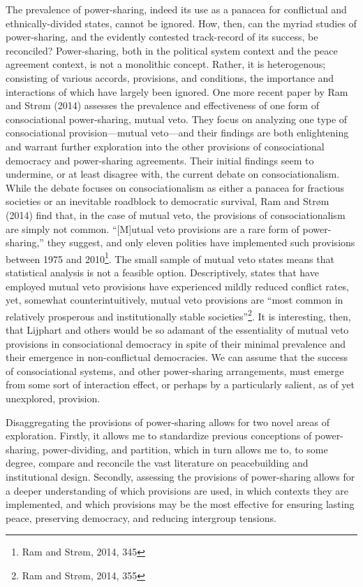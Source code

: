 \documentclass[12pt]{article}
\begin{document}
The prevalence of power-sharing, indeed its use as a panacea for conflictual and ethnically-divided states, cannot be ignored. How, then, can the myriad studies of power-sharing, and the evidently contested track-record of its success, be reconciled? Power-sharing, both in the political system context and the peace agreement context, is not a monolithic concept. Rather, it is heterogenous; consisting of various accords, provisions, and conditions, the importance and interactions of which have largely been ignored. One more recent paper by Ram and Strøm (2014) assesses the prevalence and effectiveness of one form of consociational power-sharing, mutual veto. They focus on analyzing one type of consociational provision---mutual veto---and their findings are both enlightening and warrant further exploration into the other provisions of consociational democracy and power-sharing agreements. Their initial findings seem to undermine, or at least disagree with, the current debate on consociationalism. While the debate focuses on consociationalism as either a panacea for fractious societies or an inevitable roadblock to democratic survival, Ram and Strøm (2014) find that, in the case of mutual veto, the provisions of consociationalism are simply not common. “[M]utual veto provisions are a rare form of power-sharing,” they suggest, and only eleven polities have implemented such provisions between 1975 and 2010\footnote{Ram and Strøm, 2014, 345}. The small sample of mutual veto states means that statistical analysis is not a feasible option. Descriptively, states that have employed mutual veto provisions have experienced mildly reduced conflict rates, yet, somewhat counterintuitively, mutual veto provisions are “most common in relatively prosperous and institutionally stable societies”\footnote{Ram and Strøm, 2014, 355}. It is interesting, then, that Lijphart and others would be so adamant of the essentiality of mutual veto provisions in consociational democracy in spite of their minimal prevalence and their emergence in non-conflictual democracies. We can assume that the success of consociational systems, and other power-sharing arrangements, must emerge from some sort of interaction effect, or perhaps by a particularly salient, as of yet unexplored, provision.

Disaggregating the provisions of power-sharing allows for two novel areas of exploration. Firstly, it allows me to standardize previous conceptions of power-sharing, power-dividing, and partition, which in turn allows me to, to some degree, compare and reconcile the vast literature on peacebuilding and institutional design. Secondly, assessing the provisions of power-sharing allows for a deeper understanding of which provisions are used, in which contexts they are implemented, and which provisions may be the most effective for ensuring lasting peace, preserving democracy, and reducing intergroup tensions. 
\end{document}
